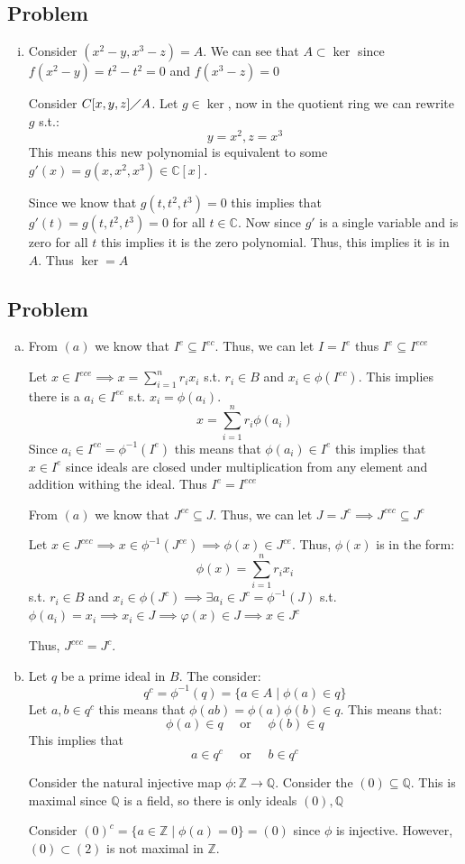 \documentclass[12pt, letterpaper]{article}
\newcounter{problem}
\newcommand{\q}{
    \newpage %
    \stepcounter{problem} %
    \subsection*{Problem \arabic{problem}} %
}
\newcommand{\C}{\mathbb{C}}
\newcommand{\Q}{\mathbb{Q}}
\newcommand{\Z}{\mathbb{Z}}
\renewcommand{\t}[1]{\text{#1}}
\begin{document}
\setlength{\parindent}{0pt}
\pagestyle{fancy}
\fancyhf{}
\fancyhead[ROE]{\thepage}

\q
\begin{enumerate}[i.]\addtocounter{enumi}{4}
    \item Consider $(x^2-y,x^3-z)=A$. We can see that $A \subset \ker$ since $f(x^2-y)=t^2-t^2=0$ and $f(x^3-z)=0$
    
    Consider $C[x,y,z] \diagup A$. Let $g \in \ker$, now in the quotient ring we can rewrite $g$ s.t.:
    \[y=x^2, z=x^3\]
    This means this new polynomial is equivalent to some $g'(x)=g(x,x^2,x^3) \in \C[x]$.

    Since we know that $g(t,t^2,t^3)=0$ this implies that $g'(t)=g(t,t^2,t^3)=0$ for all $t \in \C$. Now since $g'$ is a single variable and is zero for all $t$ this implies it is the zero polynomial. Thus, this implies it is in $A$. Thus $\ker=A$
\end{enumerate}

\q
\begin{enumerate}[(a)]\addtocounter{enumi}{1}
    \item From $(a)$ we know that $I^e \subseteq I^{ec}$. Thus, we can let $I=I^e$ thus $I^{e} \subseteq I^{ece}$
    
    Let $x \in I^{ece} \implies x=\sum_{i = 1}^n r_i x_i$ s.t. $r_i \in B$ and $x_i \in \phi(I^{ec})$. This implies there is a $a_i \in I^{ec}$ s.t. $x_i=\phi(a_i)$.
    \[ x=\sum_{i = 1}^n r_i\phi(a_i)\]
    Since $a_i \in I^{ec}=\phi^{-1}(I^e)$ this means that $\phi(a_i) \in I^e$ this implies that $x \in I^e$ since ideals are closed under multiplication from any element and addition withing the ideal. Thus $I^e = I^{ece}$

    From $(a)$ we know that $J^{ec} \subseteq J$. Thus, we can let $J=J^c \implies J^{cec} \subseteq J^c$

    Let $x \in J^{cec} \implies x \in \phi^{-1}(J^{ce}) \implies \phi(x) \in J^{ce}$. Thus, $\phi(x)$ is in the form:
    \[\phi(x)=\sum_{i=1}^{n}r_ix_i\]
    s.t. $r_i \in B$ and $x_i \in \phi(J^c) \implies \exists a_i \in J^c=\phi^{-1}(J)$ s.t. $\phi(a_i)=x_i \implies x_i \in J \implies \varphi(x) \in J \implies x \in J^c$

    Thus, $J^{cec}=J^c$.

    \item Let $q$ be a prime ideal in $B$. The consider:
    \[q^c=\phi^{-1}(q)=\{a \in A \mid \phi(a) \in q\}\]
    Let $a,b \in q^c$ this means that $\phi(ab)=\phi(a)\phi(b) \in q$. This means that:
    \[\phi(a) \in q \quad \t{ or } \quad \phi(b) \in q\]
    This implies that 
    \[a \in q^c \quad \t{ or } \quad b \in q^c\]

    Consider the natural injective map $\phi:\Z \to \Q$. Consider the $(0) \subseteq \Q$. This is maximal since $\Q$ is a field, so there is only ideals $(0),\Q$

    Consider $(0)^c=\{a \in \Z \mid \phi(a)=0\}=(0)$ since $\phi$ is injective. However, $(0) \subset (2)$ is not maximal in $\Z$.
\end{enumerate}
\end{document}
